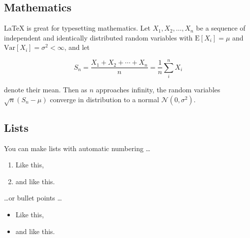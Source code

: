 \documentclass[paper=a4, fontsize=11pt,twoside]{scrartcl}
\begin{document}
\subsection*{Mathematics}

\LaTeX{} is great for typesetting mathematics. Let $X_1, X_2, \ldots, X_n$ be a sequence of independent and identically distributed random variables with $\text{E}[X_i] = \mu$ and $\text{Var}[X_i] = \sigma^2 < \infty$, and let

$$S_n = \frac{X_1 + X_2 + \cdots + X_n}{n} = \frac{1}{n}\sum_{i}^{n} X_i$$

denote their mean. Then as $n$ approaches infinity, the random variables $\sqrt{n}(S_n - \mu)$ converge in distribution to a normal $\mathcal{N}(0, \sigma^2)$.

\subsection*{Lists}

You can make lists with automatic numbering \dots

\begin{enumerate}
	\item Like this,
	\item and like this.
\end{enumerate}

\dots or bullet points \dots

\begin{itemize}
	\item Like this,
	\item and like this.
\end{itemize}
\end{document}
